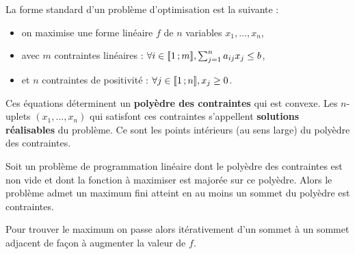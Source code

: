 La forme standard d'un problème d'optimisation est la suivante :
\begin{itemize}
	\item[\textbullet] on maximise une forme linéaire $f$ de $n$ variables $x_1, \ldots, x_n$,
	\item[\textbullet] avec $m$ contraintes linéaires : $\forall i \in \mathopen{[\![}1\mathclose{}\mathpunct{};m\mathclose{]\!]}, \sum_{j = 1}^n a_{ij}x_j \leq b$,
	\item[\textbullet] et $n$ contraintes de positivité : $\forall j \in \mathopen{[\![}1\mathclose{}\mathpunct{};n\mathclose{]\!]}, x_j \geq 0$.
\end{itemize}

Ces équations déterminent un \textbf{polyèdre des contraintes} qui est convexe.
Les $n$-uplets $(x_1,\ldots,x_n)$ qui satisfont ces contraintes s'appellent \textbf{solutions réalisables} du problème.
Ce sont les points intérieurs (au sens large) du polyèdre des contraintes.

\begin{thm}
	Soit un problème de programmation linéaire dont le polyèdre des contraintes est non vide et dont la fonction à maximiser est majorée sur ce polyèdre.
	Alors le problème admet un maximum fini atteint en au moins un sommet du polyèdre est contraintes.
\end{thm}

Pour trouver le maximum on passe alors itérativement d'un sommet à un sommet adjacent de façon à augmenter la valeur de $f$.

